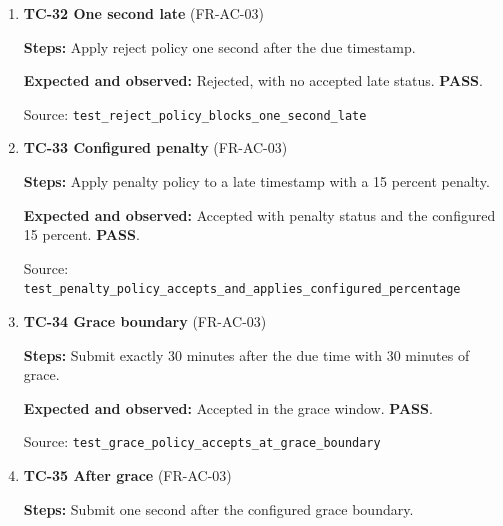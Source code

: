 \begin{enumerate}
\item \begin{minipage}[t]{\linewidth}\textbf{TC-32 One second late } (FR-AC-03)\par

\textbf{Steps:} Apply reject policy one second after the due timestamp.\par

\textbf{Expected and observed:} Rejected, with no accepted late status. \textbf{PASS}.\par

{\footnotesize Source: \nolinkurl{test_reject_policy_blocks_one_second_late}}\end{minipage}

\item \begin{minipage}[t]{\linewidth}\textbf{TC-33 Configured penalty } (FR-AC-03)\par

\textbf{Steps:} Apply penalty policy to a late timestamp with a 15 percent penalty.\par

\textbf{Expected and observed:} Accepted with penalty status and the configured 15 percent. \textbf{PASS}.\par

{\footnotesize Source: \nolinkurl{test_penalty_policy_accepts_and_applies_configured_percentage}}\end{minipage}

\item \begin{minipage}[t]{\linewidth}\textbf{TC-34 Grace boundary } (FR-AC-03)\par

\textbf{Steps:} Submit exactly 30 minutes after the due time with 30 minutes of grace.\par

\textbf{Expected and observed:} Accepted in the grace window. \textbf{PASS}.\par

{\footnotesize Source: \nolinkurl{test_grace_policy_accepts_at_grace_boundary}}\end{minipage}

\item \begin{minipage}[t]{\linewidth}\textbf{TC-35 After grace } (FR-AC-03)\par

\textbf{Steps:} Submit one second after the configured grace boundary.\par


\end{minipage}
\end{enumerate}
